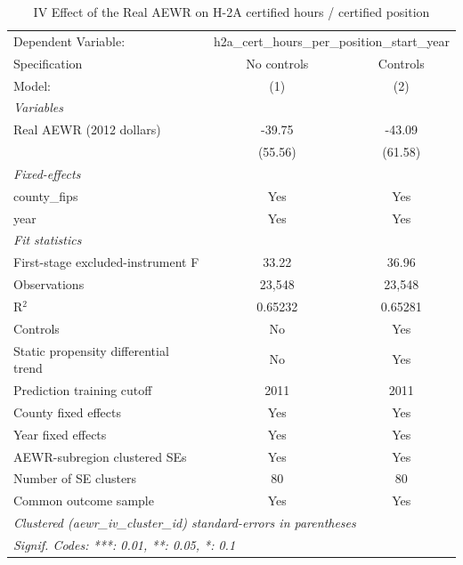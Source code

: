 
\begin{table}[htbp]
   \caption{\label{tab:iv_h2a_hours_per_position} IV Effect of the Real AEWR on H-2A certified hours / certified position}
   \centering
   \begin{tabular}{lcc}
      \tabularnewline \midrule \midrule
      Dependent Variable: & \multicolumn{2}{c}{h2a\_cert\_hours\_per\_position\_start\_year}\\
      Specification                        & No controls & Controls \\
      Model:                               & (1)         & (2)\\
      \midrule
      \emph{Variables}\\
      Real AEWR (2012 dollars)             & -39.75      & -43.09\\
                                           & (55.56)     & (61.58)\\
      \midrule
      \emph{Fixed-effects}\\
      county\_fips                         & Yes         & Yes\\
      year                                 & Yes         & Yes\\
      \midrule
      \emph{Fit statistics}\\
      First-stage excluded-instrument F    & 33.22       & 36.96\\
      Observations                         & 23,548      & 23,548\\
      R$^2$                                & 0.65232     & 0.65281\\
      Controls                             & No          & Yes\\
      Static propensity differential trend & No          & Yes\\
      Prediction training cutoff           & 2011        & 2011\\
      County fixed effects                 & Yes         & Yes\\
      Year fixed effects                   & Yes         & Yes\\
      AEWR-subregion clustered SEs         & Yes         & Yes\\
      Number of SE clusters                & 80          & 80\\
      Common outcome sample                & Yes         & Yes\\
      \midrule \midrule
      \multicolumn{3}{l}{\emph{Clustered (aewr\_iv\_cluster\_id) standard-errors in parentheses}}\\
      \multicolumn{3}{l}{\emph{Signif. Codes: ***: 0.01, **: 0.05, *: 0.1}}\\
   \end{tabular}


\end{table}
